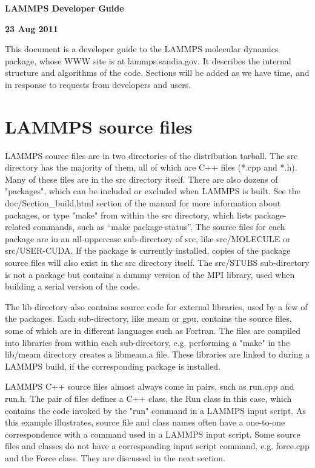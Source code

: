 \documentclass{article}
\begin{document}
\centerline{\Large \bf LAMMPS Developer Guide}
\centerline{\bf 23 Aug 2011}

\vspace{0.5in}

This document is a developer guide to the LAMMPS molecular dynamics
package, whose WWW site is at lammps.sandia.gov.  It describes the
internal structure and algorithms of the code.  Sections will be added
as we have time, and in response to requests from developers and
users.

\tableofcontents

\pagebreak
\section{LAMMPS source files}

LAMMPS source files are in two directories of the distribution
tarball.  The src directory has the majority of them, all of which are
C++ files (*.cpp and *.h).  Many of these files are in the src
directory itself.  There are also dozens of "packages", which can be
included or excluded when LAMMPS is built.  See the
doc/Section\_build.html section of the manual for more information
about packages, or type "make" from within the src directory, which
lists package-related commands, such as ``make package-status''.  The
source files for each package are in an all-uppercase sub-directory of
src, like src/MOLECULE or src/USER-CUDA.  If the package is currently
installed, copies of the package source files will also exist in the
src directory itself.  The src/STUBS sub-directory is not a package
but contains a dummy version of the MPI library, used when building a
serial version of the code.

The lib directory also contains source code for external libraries,
used by a few of the packages.  Each sub-directory, like meam or gpu,
contains the source files, some of which are in different languages
such as Fortran.  The files are compiled into libraries from within
each sub-directory, e.g. performing a "make" in the lib/meam directory
creates a libmeam.a file.  These libraries are linked to during a
LAMMPS build, if the corresponding package is installed.

LAMMPS C++ source files almost always come in pairs, such as run.cpp
and run.h.  The pair of files defines a C++ class, the Run class in
this case, which contains the code invoked by the "run" command in a
LAMMPS input script.  As this example illustrates, source file and
class names often have a one-to-one correspondence with a command used
in a LAMMPS input script.  Some source files and classes do not have a
corresponding input script command, e.g. force.cpp and the Force
class.  They are discussed in the next section.
\end{document}

